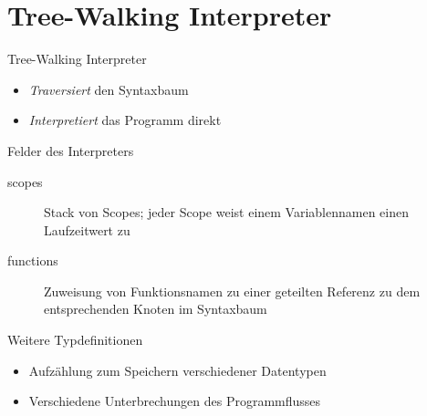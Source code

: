 \section{Tree-Walking Interpreter}

\begin{frame}{Tree-Walking Interpreter}
	\begin{itemize}
		\item \emph{Traversiert} den Syntaxbaum
		\item \emph{Interpretiert} das Programm direkt
	\end{itemize}
\end{frame}

\begin{frame}{Felder des Interpreters}
	\begin{center}
		\begin{minipage}{.9\textwidth}
		\end{minipage}
	\end{center}

	\begin{description}
		\item[scopes] Stack von Scopes; jeder Scope weist einem Variablennamen einen Laufzeitwert zu
		\item[functions] Zuweisung von Funktionsnamen zu einer geteilten Referenz zu dem entsprechenden Knoten im Syntaxbaum
	\end{description}
\end{frame}

\begin{frame}{Weitere Typdefinitionen}
	\begin{minipage}{0.6\textwidth}
	\end{minipage}
	\hfill
	\begin{minipage}{0.35\textwidth}
		\begin{itemize}
			\item Aufzählung zum Speichern verschiedener Datentypen
			\item Verschiedene Unterbrechungen des Programmflusses
		\end{itemize}
	\end{minipage}
\end{frame}

